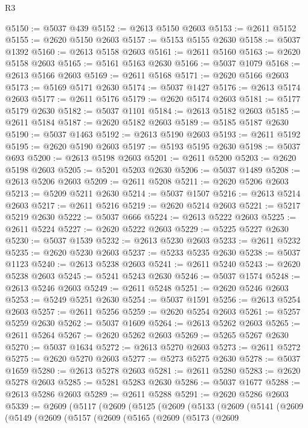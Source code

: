 \begin{lexlean}{R3}
\begin{coremodule}
@5150 := @5037 @439
@5152 := @2613 @5150 @2603
@5153 := @2611 @5152
@5155 := @2620 @5150 @2603
@5157 := @5153 @5155 @2630
@5158 := @5037 @1392
@5160 := @2613 @5158 @2603
@5161 := @2611 @5160
@5163 := @2620 @5158 @2603
@5165 := @5161 @5163 @2630
@5166 := @5037 @1079
@5168 := @2613 @5166 @2603
@5169 := @2611 @5168
@5171 := @2620 @5166 @2603
@5173 := @5169 @5171 @2630
@5174 := @5037 @1427
@5176 := @2613 @5174 @2603
@5177 := @2611 @5176
@5179 := @2620 @5174 @2603
@5181 := @5177 @5179 @2630
@5182 := @5037 @1101
@5184 := @2613 @5182 @2603
@5185 := @2611 @5184
@5187 := @2620 @5182 @2603
@5189 := @5185 @5187 @2630
@5190 := @5037 @1463
@5192 := @2613 @5190 @2603
@5193 := @2611 @5192
@5195 := @2620 @5190 @2603
@5197 := @5193 @5195 @2630
@5198 := @5037 @693
@5200 := @2613 @5198 @2603
@5201 := @2611 @5200
@5203 := @2620 @5198 @2603
@5205 := @5201 @5203 @2630
@5206 := @5037 @1489
@5208 := @2613 @5206 @2603
@5209 := @2611 @5208
@5211 := @2620 @5206 @2603
@5213 := @5209 @5211 @2630
@5214 := @5037 @1507
@5216 := @2613 @5214 @2603
@5217 := @2611 @5216
@5219 := @2620 @5214 @2603
@5221 := @5217 @5219 @2630
@5222 := @5037 @666
@5224 := @2613 @5222 @2603
@5225 := @2611 @5224
@5227 := @2620 @5222 @2603
@5229 := @5225 @5227 @2630
@5230 := @5037 @1539
@5232 := @2613 @5230 @2603
@5233 := @2611 @5232
@5235 := @2620 @5230 @2603
@5237 := @5233 @5235 @2630
@5238 := @5037 @1123
@5240 := @2613 @5238 @2603
@5241 := @2611 @5240
@5243 := @2620 @5238 @2603
@5245 := @5241 @5243 @2630
@5246 := @5037 @1574
@5248 := @2613 @5246 @2603
@5249 := @2611 @5248
@5251 := @2620 @5246 @2603
@5253 := @5249 @5251 @2630
@5254 := @5037 @1591
@5256 := @2613 @5254 @2603
@5257 := @2611 @5256
@5259 := @2620 @5254 @2603
@5261 := @5257 @5259 @2630
@5262 := @5037 @1609
@5264 := @2613 @5262 @2603
@5265 := @2611 @5264
@5267 := @2620 @5262 @2603
@5269 := @5265 @5267 @2630
@5270 := @5037 @1634
@5272 := @2613 @5270 @2603
@5273 := @2611 @5272
@5275 := @2620 @5270 @2603
@5277 := @5273 @5275 @2630
@5278 := @5037 @1659
@5280 := @2613 @5278 @2603
@5281 := @2611 @5280
@5283 := @2620 @5278 @2603
@5285 := @5281 @5283 @2630
@5286 := @5037 @1677
@5288 := @2613 @5286 @2603
@5289 := @2611 @5288
@5291 := @2620 @5286 @2603
@5339 := @2609
    (@5117
      (@2609
        (@5125
          (@2609
            (@5133
              (@2609
                (@5141
                  (@2609
                    (@5149
                      (@2609
                        (@5157
                          (@2609
                            (@5165
                              (@2609
                                (@5173
                                  (@2609

\end{coremodule}
\end{lexlean}
